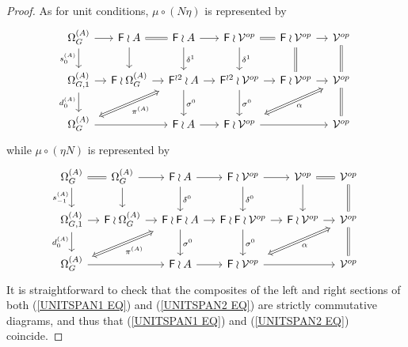 \documentclass[a4paper,10pt]{article}%
\begin{document}
\begin{proof}
  As for unit conditions, $\mu \circ (N \eta)$ is represented by
  \begin{equation}\label{UNITSPAN1 EQ}
    \begin{tikzcd}[column sep=1.05em]
      \Omega_G^{(A)} \ar{d}[swap]{s_{0}^{(A)}} \ar{r} &
      \Fin \wr A \ar{d} \ar[equal]{r} &
      \Fin \wr A \ar{d}{\delta^1} \ar{r} &
      \Fin \wr \mathcal{V}^{op} \ar{d}{\delta^1} \ar[equal]{r} &
      \Fin \wr \mathcal{V}^{op} \ar[equal]{d} \ar{r} &
      \mathcal{V}^{op} \ar[equal]{d}
      \\
      \Omega_{G,1}^{(A)} \ar{r} \ar{d}[swap]{d_{0}^{(A)}}&
      \Fin \wr \Omega_{G}^{(A)} \ar{r} &
      |[alias=FFOmega]|\Fin^{\wr 2} \wr A \ar{d}{\sigma^0} \ar{r} &
      \Fin^{\wr 2} \wr \mathcal{V}^{op} \ar{d}{\sigma^0} \ar{r} &
      \Fin \wr \mathcal{V}^{op} \ar{r} &
      |[alias=dog]|
      \mathcal{V}^{op} \ar[equal]{d}
      \\
      |[alias=Omega]|\Omega_{G}^{(A)} \ar{rr}&&
      \Fin \wr A \ar{r} &
      |[alias=cat]|
      \Fin \wr \mathcal{V}^{op} \ar{rr} &&
      \mathcal{V}^{op}
      \arrow[Leftrightarrow, from=FFOmega, to=Omega,shorten <=0.15cm,,shorten >=0.15cm,"\pi^{(A)}"]
      \arrow[Leftrightarrow, from=dog, to=cat,shorten <=0.15cm,,shorten >=0.15cm,"\alpha"]
    \end{tikzcd}
  \end{equation}
  while $\mu \circ (\eta N)$ is represented by 
  \begin{equation}\label{UNITSPAN2 EQ}
    \begin{tikzcd}[column sep=1.05em]
      \Omega^{(A)}_G \ar{d}[swap]{s_{-1}^{(A)}} \ar[equal]{r} &
      \Omega^{(A)}_G \ar{d} \ar{r} &
      \Fin \wr A \ar{d}{\delta^0} \ar{r} &
      \Fin \wr \mathcal{V}^{op} \ar{d}{\delta^0} \ar{r} &
      \mathcal{V}^{op} \ar{d} \ar[equal]{r} &
      \mathcal{V}^{op} \ar[equal]{d}
      \\
      \Omega_{G,1}^{(A)} \ar{r} \ar{d}[swap]{d_{0}^{(A)}}&
      \Fin \wr \Omega_{G}^{(A)} \ar{r} &
      |[alias=FFOmega]|\Fin \wr \Fin \wr A \ar{d}{\sigma^0} \ar{r} &
      \Fin \wr \Fin \wr \mathcal{V}^{op} \ar{d}{\sigma^0} \ar{r} &
      \Fin \wr \mathcal{V}^{op} \ar{r} &
      |[alias=dog]|
      \mathcal{V}^{op} \ar[equal]{d}
      \\
      |[alias=Omega]|\Omega_{G}^{(A)} \ar{rr} &&
      \Fin \wr A \ar{r} &
      |[alias=cat]|
      \Fin \wr \mathcal{V}^{op} \ar{rr} &&
      \mathcal{V}^{op}
      \arrow[Leftrightarrow, from=FFOmega, to=Omega,shorten <=0.15cm,,shorten >=0.15cm,"\pi^{(A)}"]
      \arrow[Leftrightarrow, from=dog, to=cat,shorten <=0.15cm,,shorten >=0.15cm,"\alpha"]
    \end{tikzcd}
  \end{equation}
  It is straightforward to check that the composites of the left and right sections of both (\ref{UNITSPAN1 EQ}) and (\ref{UNITSPAN2 EQ}) are strictly commutative diagrams, and thus that 
  (\ref{UNITSPAN1 EQ}) and (\ref{UNITSPAN2 EQ}) coincide.
\end{proof}
\end{document}
